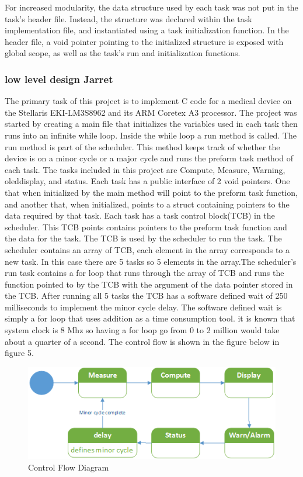 \documentclass[12pt]{article} %
\begin{document}
For increased modularity, the data structure used by each task was not put in
the task's header file.  Instead, the structure was declared within the task
implementation file, and instantiated using a task initialization function.  In
the header file, a void pointer pointing to the initialized structure is
exposed with global scope, as well as the task's run and initialization functions.

\subsubsection{low level design  Jarret}


The primary task of this project is to implement C code for a medical device on the Stellaris EKI-LM3S8962 and its ARM Coretex A3 processor. The project was started by creating a main file that initializes the variables used in each task then runs into an infinite while loop. Inside the while loop a run method is called. The run method is part of the scheduler. This method keeps track of whether the device is on a minor cycle or a major cycle and runs the preform task method of each task. The tasks included in this project are Compute, Measure, Warning, oleddisplay, and status. Each task has a public interface of 2 void pointers. One that when initialized by the main method will point to the preform task function, and another that, when initialized, points to a struct containing pointers to the data required by that task. Each task has a task control block(TCB) in the scheduler. This TCB points contains pointers to the preform task function and the data for the task. The TCB is used by the scheduler to run the task. The scheduler contains an array of TCB, each element in the array corresponds to a new task. In this case there are 5 tasks so 5 elements in the array.The scheduler's run task contains a for loop that runs through the array of TCB and runs the function pointed to by the TCB with the argument of the data pointer stored in the TCB. After running all 5 tasks the TCB has a software defined wait of 250 milliseconds to implement the minor cycle delay. The software defined wait is simply a for loop that uses addition as a time consumption tool. it is known that system clock is 8 Mhz so having a for loop go from 0 to 2 million would take about a quarter of a second. The control flow is shown in the figure below in figure 5. 

\begin{figure}
    \centering
    \includegraphics[width=\textwidth]{design/Control_state_diagram.png}
    \caption{Control Flow Diagram}
    \label{fig:Control}
\end{figure}
\end{document}
